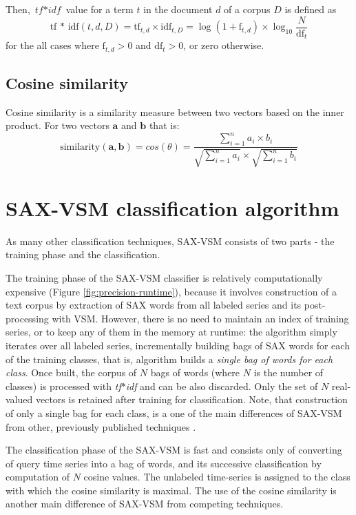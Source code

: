 \documentclass{llncs}
\begin{document}
Then, $\textit{tf$\ast$idf}$ value for a term $t$ in the document $d$ of a corpus $D$ is defined as 
\begin{equation}
 \mbox{tf * idf}(t, d, D) =  \mbox{tf}_{t, d} \times \mbox{idf}_{t, D} = \log(1 + \mbox{f}_{t,d})
\times \log_{10}\frac{N}{\mbox{df}_{t}}
\end{equation} 
for the all cases where $\mbox{f}_{t,d}>0$ and $\mbox{df}_{t}>0$, or zero otherwise.

\subsection{Cosine similarity}
Cosine similarity is a similarity measure between two vectors based on the inner product. 
For two vectors $\boldsymbol{a}$ and $\boldsymbol{b}$ that is:
\begin{equation}
 \mbox{similarity}(\boldsymbol{a},\boldsymbol{b}) = cos(\theta) = \frac{ \sum\limits^{n}_{i=1} a_{i} \times b_{i} }{
\sqrt{\sum\limits^{n}_{i=1} a_{i}} \times \sqrt{\sum\limits^{n}_{i=1} b_{i}} }
\end{equation} 


\section{SAX-VSM classification algorithm }
As many other classification techniques, SAX-VSM consists of two parts - the training phase 
and the classification. 

The training phase of the SAX-VSM classifier is relatively computationally expensive 
(Figure \ref{fig:precision-runtime}), because it involves construction of a text corpus by extraction 
of SAX words from all labeled series and its post-processing with VSM. However, there is no need 
to maintain an index of training series, or to keep any of them in the memory at runtime:
the algorithm simply iterates over all labeled series, incrementally building bags of SAX words for
each of the training classes, that is, algorithm builds a \textit{single bag of words for each
class}. Once built, the corpus of $N$ bags of words (where $N$ is the number of classes) is
processed with \textit{tf$\ast$idf} and can be also discarded. Only the set of $N$ real-valued
vectors is retained after training for classification. Note, that construction of only a single bag for
each class, is a one of the main differences of SAX-VSM from other, previously published 
techniques \cite{bag_patterns}.

The classification phase of the SAX-VSM is fast and consists only of converting of query time series
into a bag of words, and its successive classification by computation of $N$ cosine values. The
unlabeled time-series is assigned to the class with which the cosine similarity is maximal. 
The use of the cosine similarity is another main difference of SAX-VSM from competing techniques.
\end{document}
